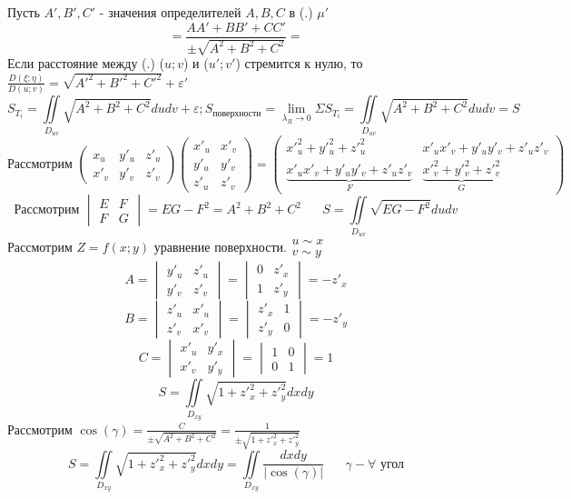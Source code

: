 \documentclass[12pt]{article}
\let\oldiint\iint
\let\oldlim\lim
\renewcommand{\iint}{\oldiint\limits}
\renewcommand{\lim}{\oldlim\limits}
\begin{document}
  Пусть $A',B',C'$ - значения определителей $A,B,C$ в (.) $\mu'$
  \[\boxed{=}
  \frac{AA'+BB'+CC'}{\pm \sqrt{A^2+B^2+C^2}}
  \boxed{=}\]
  Если расстояние между (.) ($u;v$) и ($u';v'$) стремится к нулю, то $\frac{D(\xi;\eta)}{D(u;v)} = \sqrt{A'^2+B'^2+C'^2}+\varepsilon'$
  \[
  S_{T_i}=\iint_{D_{uv}}\sqrt{A^2+B^2+C^2}dudv+\varepsilon;S_\text{поверхности}=\lim_{\lambda_R \to 0}\Sigma S_{T_i}=\iint_{D_{uv}}\sqrt{A^2+B^2+C^2}dudv=S
  \]
  \[
  \text{Рассмотрим }
  \begin{pmatrix}
    x_u & y'_u &z'_u\\
    x'_v&y'_v&z'_v
  \end{pmatrix}
  \begin{pmatrix}
    x'_u &x'_v\\
    y'_u&y'_v\\
    z'_u&z'_v
  \end{pmatrix}
  =
  \begin{pmatrix}
    x'^2_u+y'^2_u+z'^2_u & x'_u x'_v+y'_u y'_v+ z'_u z'_v\\
    \underbrace{x'_u x'_v+y'_u y'_v+ z'_u z'_v}_F & \underbrace{x'^2_v+y'^2_v+z'^2_v}_{G}
  \end{pmatrix}
  \]
  \[
  \text{Рассмотрим } \begin{vmatrix}
    E & F\\
    F & G
  \end{vmatrix} =EG-F^2=A^2+B^2+C^2 \hspace{20pt} S=\iint_{D_{uv}}\sqrt{EG-F^2}dudv
  \]
  $\text{Рассмотрим } Z=f(x;y) \text{ уравнение поверхности}.
  \begin{matrix}
    u \sim x\\
    v \sim y
  \end{matrix}$ 
  \[ A=
  \begin{vmatrix}
    y'_u & z'_u \\
    y'_v & z'_v
  \end{vmatrix} =\begin{vmatrix}
    0 & z'_x\\
    1 & z'_y
  \end{vmatrix}=-z'_x\]
  \[ B=
  \begin{vmatrix}
    z'_u & x'_u \\
    z'_v & x'_v
  \end{vmatrix} =\begin{vmatrix}
    z'_x & 1\\
    z'_y & 0
  \end{vmatrix}=-z'_y\]
  \[ C=
  \begin{vmatrix}
    x'_u & y'_x\\
    x'_v & y'_y
  \end{vmatrix} =\begin{vmatrix}
    1 & 0\\
    0 & 1
  \end{vmatrix}=1\]
  \[S=\iint_{D_{xy}}\sqrt{1 + z'^2_x + z'^2_y}dxdy\]
  Рассмотрим $\cos(\gamma)=\frac{C}{\pm \sqrt{A^2+B^2+C^2}}=\frac{1}{\pm \sqrt{1+z'^2_x+z'^2_y}}$
  \[S=\iint_{D_{xy}}\sqrt{1+z'^2_x+z'^2_y}dxdy=\iint_{D_{xy}}\frac{dxdy}{|\cos(\gamma)|} \hspace{20pt} \gamma - \forall \text{ угол}\]
  \break
\end{document}
